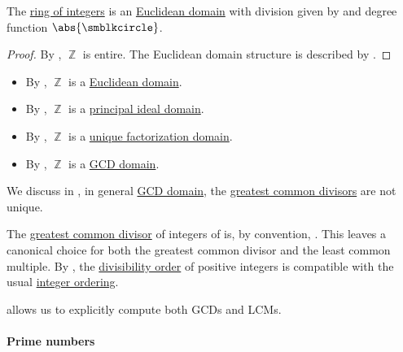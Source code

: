 \begin{proposition}\label{thm:integers_are_euclidean_domain}
  The \hyperref[def:integers]{ring of integers} is an \hyperref[def:euclidean_domain]{Euclidean domain} with division given by  and degree function \( \abs{\anon} \).
\end{proposition}
\begin{proof}
  By , \( \BbbZ \) is entire. The Euclidean domain structure is described by .
\end{proof}

\begin{remark}\label{rem:integer_domain_chain}\hfill
  \begin{itemize}
    \item By , \( \BbbZ \) is a \hyperref[def:euclidean_domain]{Euclidean domain}.
    \item By , \( \BbbZ \) is a \hyperref[def:principal_ideal_domain]{principal ideal domain}.
    \item By , \( \BbbZ \) is a \hyperref[def:unique_factorization_domain]{unique factorization domain}.
    \item By , \( \BbbZ \) is a \hyperref[def:gcd_domain]{GCD domain}.
  \end{itemize}
\end{remark}

\begin{remark}\label{rem:integer_gcd}
  We discuss in , in general \hyperref[def:gcd_domain]{GCD domain}, the \hyperref[def:gcd]{greatest common divisors} are not unique.

  The \hyperref[def:gcd]{greatest common divisor} of integers of is, by convention, . This leaves a canonical choice for both the greatest common divisor and the least common multiple. By , the \hyperref[thm:semiring_divisibility_order]{divisibility order} of positive integers is compatible with the usual \hyperref[def:integer_ordering]{integer ordering}.

   allows us to explicitly compute both GCDs and LCMs.
\end{remark}

\paragraph{Prime numbers}

